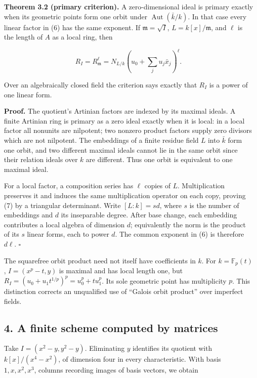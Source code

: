 \documentclass[
]{article}
\begin{document}
\textbf{Theorem 3.2 (primary criterion).} A zero-dimensional ideal is
primary exactly when its geometric points form one orbit under
\(\operatorname{Aut}(\bar k/k)\). In that case every linear factor in
(6) has the same exponent. If \(\mathfrak m=\sqrt I\),
\(L=k[x]/\mathfrak m\), and \(\ell\) is the length of \(A\) as a local
ring, then

\[
R_I=R_{\mathfrak m}^{\ell}
=N_{L/k}\left(u_0+\sum_j u_j\bar x_j\right)^{\ell}.
\tag{7}
\]

Over an algebraically closed field the criterion says exactly that
\(R_I\) is a power of one linear form.

\textbf{Proof.} The quotient's Artinian factors are indexed by its
maximal ideals. A finite Artinian ring is primary as a zero ideal
exactly when it is local: in a local factor all nonunits are nilpotent;
two nonzero product factors supply zero divisors which are not
nilpotent. The embeddings of a finite residue field \(L\) into
\(\bar k\) form one orbit, and two different maximal ideals cannot lie
in the same orbit since their relation ideals over \(k\) are different.
Thus one orbit is equivalent to one maximal ideal.

For a local factor, a composition series has \(\ell\) copies of \(L\).
Multiplication preserves it and induces the same multiplication operator
on each copy, proving (7) by a triangular determinant. Write
\([L:k]=sd\), where \(s\) is the number of embeddings and \(d\) its
inseparable degree. After base change, each embedding contributes a
local algebra of dimension \(d\); equivalently the norm is the product
of its \(s\) linear forms, each to power \(d\). The common exponent in
(6) is therefore \(d\ell\). \(\square\)

The squarefree orbit product need not itself have coefficients in \(k\).
For \(k=\mathbb F_p(t)\), \(I=(x^p-t,y)\) is maximal and has local
length one, but \(R_I=(u_0+u_1t^{1/p})^p=u_0^p+t u_1^p\). Its sole
geometric point has multiplicity \(p\). This distinction corrects an
unqualified use of ``Galois orbit product'' over imperfect fields.

\subsection{4. A finite scheme computed by
matrices}\label{a-finite-scheme-computed-by-matrices}

Take \(I=(x^2-y,y^2-y)\). Eliminating \(y\) identifies its quotient with
\(k[x]/(x^4-x^2)\), of dimension four in every characteristic. With
basis \(1,x,x^2,x^3\), columns recording images of basis vectors, we
obtain
\end{document}
